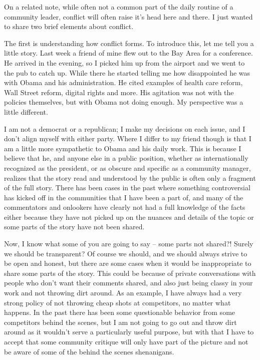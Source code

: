 On a related note, while often not a common part of the daily routine of a community leader, conflict will often raise it’s head here and there. I just wanted to share two brief elements about conflict.

The first is understanding how conflict forms. To introduce this, let me tell you a little story. Last week a friend of mine flew out to the Bay Area for a conference. He arrived in the evening, so I picked him up from the airport and we went to the pub to catch up. While there he started telling me how disappointed he was with Obama and his administration. He cited examples of health care reform, Wall Street reform, digital rights and more. His agitation was not with the policies themselves, but with Obama not doing enough. My perspective was a little different.

I am not a democrat or a republican; I make my decisions on each issue, and I don’t align myself with either party. Where I differ to my friend though is that I am a little more sympathetic to Obama and his daily work. This is because I believe that he, and anyone else in a public position, whether as internationally recognized as the president, or as obscure and specific as a community manager, realizes that the story read and understood by the public is often only a fragment of the full story. There has been cases in the past where something controversial has kicked off in the communities that I have been a part of, and many of the commentators and onlookers have clearly not had a full knowledge of the facts either because they have not picked up on the nuances and details of the topic or some parts of the story have not been shared.

Now, I know what some of you are going to say – some parts not shared?! Surely we should be transparent? Of course we should, and we should always strive to be open and honest, but there are some cases when it would be inappropriate to share some parts of the story. This could be because of private conversations with people who don’t want their comments shared, and also just being classy in your work and not throwing dirt around. As an example, I have always had a very strong policy of not throwing cheap shots at competitors, no matter what happens. In the past there has been some questionable behavior from some competitors behind the scenes, but I am not going to go out and throw dirt around as it wouldn’t serve a particularly useful purpose, but with that I have to accept that some community critique will only have part of the picture and not be aware of some of the behind the scenes shenanigans.

